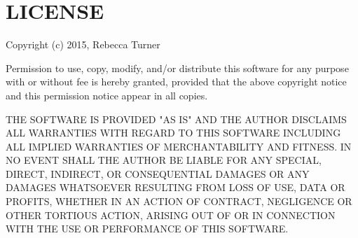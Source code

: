 \chapter{LICENSE}
\hypertarget{md_node__modules_2write-file-atomic_2_l_i_c_e_n_s_e}{}\label{md_node__modules_2write-file-atomic_2_l_i_c_e_n_s_e}
Copyright (c) 2015, Rebecca Turner

Permission to use, copy, modify, and/or distribute this software for any purpose with or without fee is hereby granted, provided that the above copyright notice and this permission notice appear in all copies.

THE SOFTWARE IS PROVIDED "{}\+AS IS"{} AND THE AUTHOR DISCLAIMS ALL WARRANTIES WITH REGARD TO THIS SOFTWARE INCLUDING ALL IMPLIED WARRANTIES OF MERCHANTABILITY AND FITNESS. IN NO EVENT SHALL THE AUTHOR BE LIABLE FOR ANY SPECIAL, DIRECT, INDIRECT, OR CONSEQUENTIAL DAMAGES OR ANY DAMAGES WHATSOEVER RESULTING FROM LOSS OF USE, DATA OR PROFITS, WHETHER IN AN ACTION OF CONTRACT, NEGLIGENCE OR OTHER TORTIOUS ACTION, ARISING OUT OF OR IN CONNECTION WITH THE USE OR PERFORMANCE OF THIS SOFTWARE. 